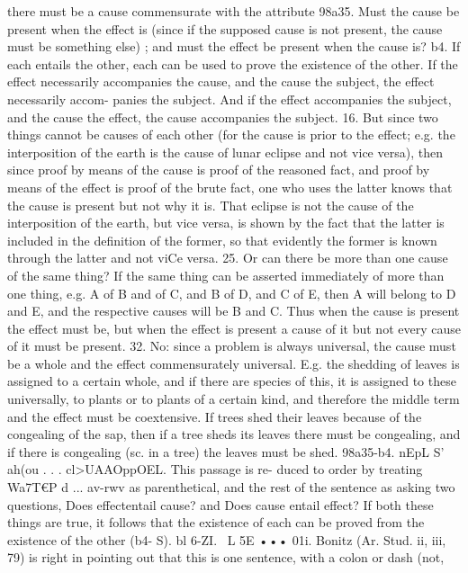 {{{{{{{{{{{{{{{{{{{{{{{{{{{{{{{{{{{{{{{{{{{{{{{{{{{{{{{{{{{{{{{{{{{{{{there must be a cause commensurate with the attribute
98a35. Must the cause be present when the effect is (since if the
supposed cause is not present, the cause must be something else) ;
and must the effect be present when the cause is?
b4. If each entails the other, each can be used to prove the
existence of the other. If the effect necessarily accompanies the
cause, and the cause the subject, the effect necessarily accom-
panies the subject. And if the effect accompanies the subject,
and the cause the effect, the cause accompanies the subject.
16. But since two things cannot be causes of each other (for
the cause is prior to the effect; e.g. the interposition of the earth
is the cause of lunar eclipse and not vice versa), then since proof
by means of the cause is proof of the reasoned fact, and proof
by means of the effect is proof of the brute fact, one who uses the
latter knows that the cause is present but not why it is. That
eclipse is not the cause of the interposition of the earth, but vice
versa, is shown by the fact that the latter is included in the
definition of the former, so that evidently the former is known
through the latter and not viCe versa.
25. Or can there be more than one cause of the same thing?
If the same thing can be asserted immediately of more than one
thing, e.g. A of B and of C, and B of D, and C of E, then A will
belong to D and E, and the respective causes will be B and C.
Thus when the cause is present the effect must be, but when the
effect is present a cause of it but not every cause of it must be
present.
32. No: since a problem is always universal, the cause must
be a whole and the effect commensurately universal. E.g. the
shedding of leaves is assigned to a certain whole, and if there are
species of this, it is assigned to these universally, to plants or to
plants of a certain kind, and therefore the middle term and the
effect must be coextensive. If trees shed their leaves because of
the congealing of the sap, then if a tree sheds its leaves there must
be congealing, and if there is congealing (sc. in a tree) the leaves
must be shed.
98a35-b4. nEpL S' ah(ou . . . cl>UAAOppOEL. This passage is re-
duced to order by treating Wa7T€P d ... av-rwv as parenthetical,
and the rest of the sentence as asking two questions, Does effectentail cause? and Does cause entail effect? If both these things
are true, it follows that the existence of each can be proved from
the existence of the other (b4- S).
bl 6-ZI. ~L 5E ••• 01i. Bonitz (Ar. Stud. ii, iii, 79) is right in
pointing out that this is one sentence, with a colon or dash (not,
}}}}}}}}}}}}}}}}}}}}}}}}}}}}}}}}}}}}}}}}}}}}}}}}}}}}}}}}}}}}}}}}}}}}}}
